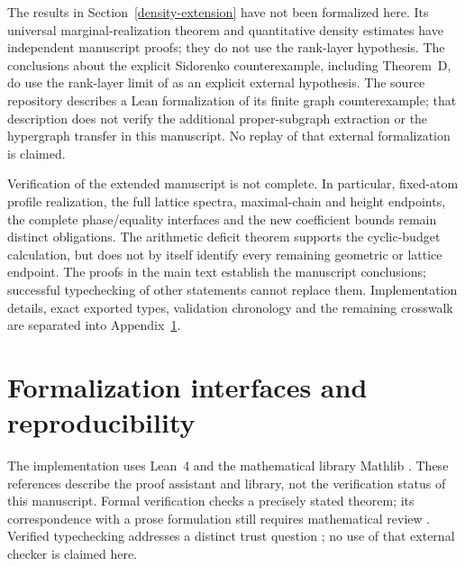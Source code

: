 \documentclass[a4paper,11pt,reqno]{amsart}
\theoremstyle{plain}
\theoremstyle{definition}
\theoremstyle{remark}
\begin{document}
The results in Section~\ref{density-extension} have not been
formalized here.  Its universal marginal-realization theorem and
quantitative density estimates have independent manuscript proofs;
they do not use the rank-layer hypothesis.  The conclusions about
the explicit Sidorenko counterexample, including Theorem~D, do use
the rank-layer limit of \citet{openai161} as an explicit external
hypothesis.  The source repository describes a Lean formalization
of its finite graph counterexample; that description does not verify
the additional proper-subgraph extraction or the hypergraph transfer
in this manuscript.  No replay of that external formalization is claimed.


Verification of the extended manuscript is not complete.  In particular,
fixed-atom profile realization, the full lattice spectra, maximal-chain and
height endpoints, the complete phase/equality interfaces and the new
coefficient bounds remain distinct obligations.  The arithmetic deficit
theorem supports the cyclic-budget calculation, but does not by itself
identify every remaining geometric or lattice endpoint.  The proofs in the
main text establish the manuscript conclusions; successful typechecking of
other statements cannot replace them.  Implementation details, exact exported
types, validation chronology and the remaining crosswalk are separated into
Appendix~\ref{appendix-formalization}.

\appendix
\section{Formalization interfaces and reproducibility}\label{appendix-formalization}

The implementation uses Lean~4 \citep{demoura2021} and the mathematical
library Mathlib \citep{mathlib2020}.  These references describe the proof
assistant and library, not the verification status of this manuscript.
Formal verification checks a precisely stated theorem; its correspondence
with a prose formulation still requires mathematical review
\citep{avigadharrison2014}.  Verified typechecking addresses a distinct trust
question \citep{carneiro2025}; no use of that external checker is claimed here.
\end{document}
